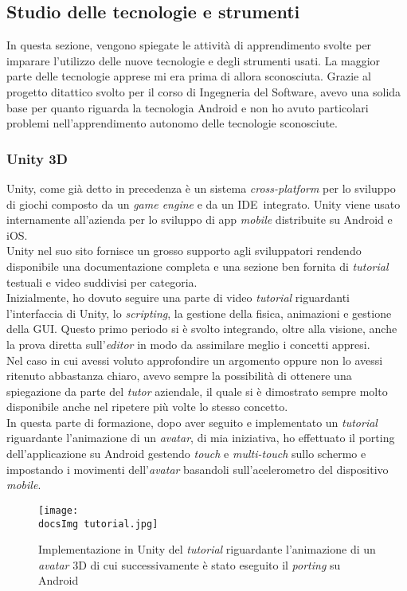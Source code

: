 \subsection{Studio delle tecnologie e strumenti}
In questa sezione, vengono spiegate le attivit\`a di apprendimento svolte per imparare l'utilizzo delle nuove tecnologie e degli strumenti usati. La maggior parte delle tecnologie apprese mi era prima di allora sconosciuta. Grazie al progetto ditattico svolto per il corso di Ingegneria del Software, avevo una solida base per quanto riguarda la tecnologia Android e non ho avuto particolari problemi nell'apprendimento autonomo delle tecnologie sconosciute.
\subsubsection{Unity 3D}
Unity, come gi\`a detto in precedenza \`e un sistema \textit{cross-platform\gloss} per lo sviluppo di giochi composto da un \textit{game engine} e da un IDE\gloss\ integrato. Unity viene usato internamente all'azienda per lo sviluppo di app \textit{mobile} distribuite su Android e iOS.
\\
Unity nel suo sito fornisce un grosso supporto agli sviluppatori rendendo disponibile una documentazione completa e una sezione ben fornita di \textit{tutorial} testuali e video suddivisi per categoria.\\
Inizialmente, ho dovuto seguire una parte di video \textit{tutorial} riguardanti l'interfaccia di Unity, lo \textit{scripting}, la gestione della fisica, animazioni e gestione della GUI\gloss . Questo primo periodo si \`e svolto integrando, oltre alla visione, anche la prova diretta sull'\textit{editor} in modo da assimilare meglio i concetti appresi.\\
Nel caso in cui avessi voluto approfondire un argomento oppure non lo avessi ritenuto abbastanza chiaro, avevo sempre la possibilit\`a di ottenere una spiegazione da parte del \textit{tutor} aziendale, il quale si \`e dimostrato sempre molto disponibile anche nel ripetere pi\`u volte lo stesso concetto.\\
In questa parte di formazione, dopo aver seguito e implementato un \textit{tutorial} riguardante l'animazione di un \textit{avatar\gloss}, di mia iniziativa, ho effettuato il porting dell'applicazione su Android gestendo \textit{touch} e \textit{multi-touch} sullo schermo e impostando i movimenti dell'\textit{avatar\gloss} basandoli sull'acelerometro del dispositivo \textit{mobile}.

\begin{figure}[H]
	\centering
	\texttt{[image: \\docsImg tutorial.jpg]}
	\caption{Implementazione in Unity del \textit{tutorial} riguardante l'animazione di un \textit{avatar\gloss} 3D di cui successivamente \`e stato eseguito il \textit{porting} su Android}
	\label{fig:tutorial riguardante l'animazione di un avatar\gloss 3D}
\end{figure}
 
